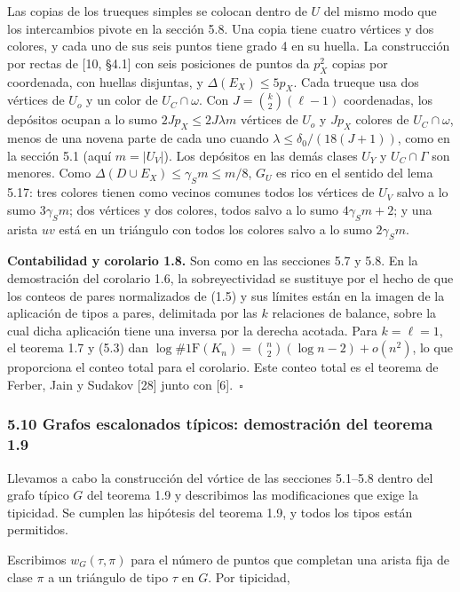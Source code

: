 \documentclass[spanish,11pt,a4paper]{article}
\begin{document}
Las copias de los trueques simples se colocan dentro de \(U\) del mismo modo que los intercambios pivote en la sección 5.8. Una copia tiene cuatro vértices y dos colores, y cada uno de sus seis puntos tiene grado 4 en su huella. La construcción por rectas de {[}10, §4.1{]} con seis posiciones de puntos da \(p_X^2\) copias por coordenada, con huellas disjuntas, y \(\Delta(E_X)\le5p_X\). Cada trueque usa dos vértices de \(U_o\) y un color de \(U_C\cap\omega\). Con \(J=\binom{k}{2}(\ell-1)\) coordenadas, los depósitos ocupan a lo sumo \(2Jp_X\le2J\lambda m\) vértices de \(U_o\) y \(Jp_X\) colores de \(U_C\cap\omega\), menos de una novena parte de cada uno cuando \(\lambda\le\delta_0/(18(J+1))\), como en la sección 5.1 (aquí \(m=|U_V|\)). Los depósitos en las demás clases \(U_Y\) y \(U_C\cap\Gamma\) son menores. Como \(\Delta(D\cup E_X)\le\gamma_Sm\le m/8\), \(G_U\) es rico en el sentido del lema 5.17: tres colores tienen como vecinos comunes todos los vértices de \(U_V\) salvo a lo sumo \(3\gamma_Sm\); dos vértices y dos colores, todos salvo a lo sumo \(4\gamma_Sm+2\); y una arista \(uv\) está en un triángulo con todos los colores salvo a lo sumo \(2\gamma_Sm\).

\textbf{Contabilidad y corolario 1.8.} Son como en las secciones 5.7 y 5.8. En la demostración del corolario 1.6, la sobreyectividad se sustituye por el hecho de que los conteos de pares normalizados de (1.5) y sus límites están en la imagen de la aplicación de tipos a pares, delimitada por las \(k\) relaciones de balance, sobre la cual dicha aplicación tiene una inversa por la derecha acotada. Para \(k=\ell=1\), el teorema 1.7 y (5.3) dan \(\log\#\mathrm{1F}(K_n)=\binom{n}{2}(\log n-2)+o(n^2)\), lo que proporciona el conteo total para el corolario. Este conteo total es el teorema de Ferber, Jain y Sudakov {[}28{]} junto con {[}6{]}.~\(\square\)

\subsubsection{5.10 Grafos escalonados típicos: demostración del teorema 1.9}\label{grafos-escalonados-tuxedpicos-demostraciuxf3n-del-teorema-1.9}

Llevamos a cabo la construcción del vórtice de las secciones 5.1--5.8 dentro del grafo típico \(G\) del teorema 1.9 y describimos las modificaciones que exige la tipicidad. Se cumplen las hipótesis del teorema 1.9, y todos los tipos están permitidos.

Escribimos \(w_G(\tau,\pi)\) para el número de puntos que completan una arista fija de clase \(\pi\) a un triángulo de tipo \(\tau\) en \(G\). Por tipicidad,
\end{document}
